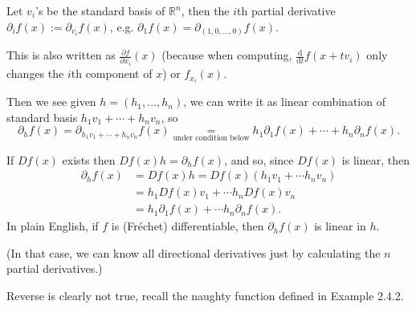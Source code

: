 \documentclass[a4paper]{article}
\theoremstyle{definition}
\begin{document}
Let $v_i$'s be the standard basis of $\mathbb R^n$, then the $i$th partial derivative $\partial_i f(x):=\partial_{v_i}f(x)$, e.g. $\partial _1 f(x) = \partial _{(1,0,\ldots,0)} f(x)$.

This is also written as $\frac{\partial f}{\partial x_i}(x)$ (because when computing, $\frac{\mathrm d}{\mathrm d t} f(x+tv_i)$ only changes the $i$th component of $x$) or $f_{x_i}(x)$.

Then we see given $h=(h_1,\ldots,h_n)$, we can write it as linear combination of standard basis $h_1v_1+\cdots+h_nv_n$, so
\[
\partial_h f(x) = \partial_{h_1v_1+\cdots+h_nv_n} f(x) \underset{\text{under condition below}}{=} h_1 \partial_1 f(x) +\cdots +h_n \partial _n f(x).
\]

If $Df(x)$ exists then $Df(x)h=\partial_h f(x)$, and so, since $Df(x)$ is linear, then
\[
\begin{aligned}\partial_h f(x) &= Df(x)h=Df(x) (h_1v_1+\cdots h_nv_n) \\&= h_1 Df(x) v_1+\cdots h_n Df(x) v_n \\&= h_1 \partial _1 f(x)+\cdots h_n \partial_n f(x).\end{aligned}
\]
In plain English, if $f$ is (Fréchet) differentiable, then $\partial _h f(x)$ is linear in $h$.

(In that case, we can know all directional derivatives just by calculating the $n$ partial derivatives.)

Reverse is clearly not true, recall the naughty function defined in Example 2.4.2.
\end{document}
